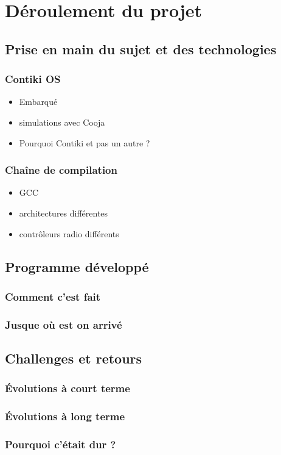 \chapter{Déroulement du projet}
\label{sec:deroulement}

\section{Prise en main du sujet et des technologies}
	
	\subsection{Contiki OS}
		\begin{itemize}
			\item Embarqué
			\item simulations avec Cooja
			\item Pourquoi Contiki et pas un autre ?
		\end{itemize}
	
	\subsection{Chaîne de compilation}
		\begin{itemize}
			\item GCC
			\item architectures différentes
			\item contrôleurs radio différents
		\end{itemize}

\section{Programme développé}
	\subsection{Comment c'est fait}
	\subsection{Jusque où est on arrivé}

\section{Challenges et retours}
	\subsection{Évolutions à court terme}
	\subsection{Évolutions à long terme}
	\subsection{Pourquoi c'était dur ?}


